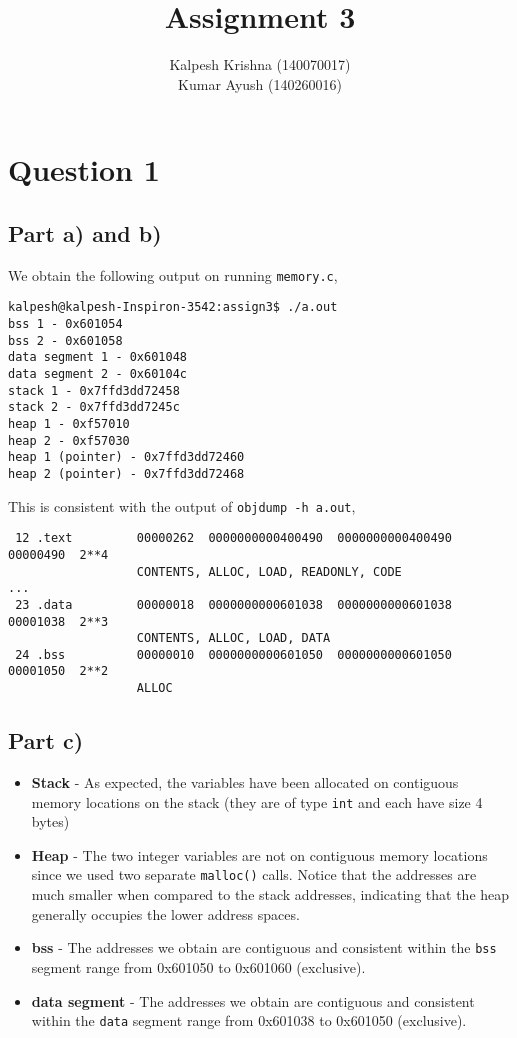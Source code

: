 \documentclass[a4paper,12pt]{article}
\title{\textbf{Assignment 3}}
\author{Kalpesh Krishna (140070017) \\ Kumar Ayush (140260016)}
\date{}
\begin{document}
\maketitle


\section{Question 1}
\subsection{Part a) and b)}
We obtain the following output on running \texttt{memory.c},
\begin{lstlisting}
kalpesh@kalpesh-Inspiron-3542:assign3$ ./a.out 
bss 1 - 0x601054
bss 2 - 0x601058
data segment 1 - 0x601048
data segment 2 - 0x60104c
stack 1 - 0x7ffd3dd72458
stack 2 - 0x7ffd3dd7245c
heap 1 - 0xf57010
heap 2 - 0xf57030
heap 1 (pointer) - 0x7ffd3dd72460
heap 2 (pointer) - 0x7ffd3dd72468
\end{lstlisting}
This is consistent with the output of \texttt{objdump -h a.out},
\begin{lstlisting}
 12 .text         00000262  0000000000400490  0000000000400490  00000490  2**4
                  CONTENTS, ALLOC, LOAD, READONLY, CODE
...
 23 .data         00000018  0000000000601038  0000000000601038  00001038  2**3
                  CONTENTS, ALLOC, LOAD, DATA
 24 .bss          00000010  0000000000601050  0000000000601050  00001050  2**2
                  ALLOC
\end{lstlisting}
\subsection{Part c)}
\begin{itemize}
\item \textbf{Stack} - As expected, the variables have been allocated on contiguous memory locations on the stack (they are of type \texttt{int} and each have size 4 bytes)
\item \textbf{Heap} - The two integer variables are not on contiguous memory locations since we used two separate \texttt{malloc()} calls. Notice that the addresses are much smaller when compared to the stack addresses, indicating that the heap generally occupies the lower address spaces.
\item \textbf{bss} - The addresses we obtain are contiguous and consistent within the \texttt{bss} segment range from 0x601050 to 0x601060 (exclusive).
\item \textbf{data segment} - The addresses we obtain are contiguous and consistent within the \texttt{data} segment range from 0x601038 to 0x601050 (exclusive).
\end{itemize}
\end{document}
